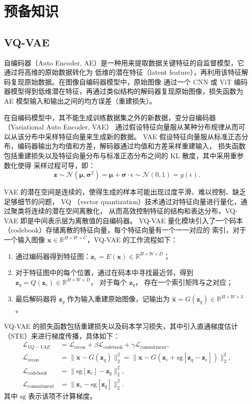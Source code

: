 \section{预备知识}
\subsection{VQ-VAE}
自编码器（Auto Encoder, AE）是一种用来提取数据关键特征的自监督模型，它通过将高维的原始数据转化为
低维的潜在特征（latent feature），再利用该特征解码复现原始数据。在图像自编码器模型中，原始图像
通过一个 CNN 或 ViT 编码器模型得到低维潜在特征，再通过类似结构的解码器复现原始图像，损失函数为
AE 模型输入和输出之间的均方误差（重建损失）。

在自编码模型中，其不能生成训练数据集之外的新数据，变分自编码器（Variational Auto Encoder, VAE）
通过假设特征向量服从某种分布规律从而可以从该分布中采样特征向量来生成新的数据。
VAE 假设特征向量服从标准正态分布，编码器输出为均值和方差，解码器通过均值和方差采样重建输入，
损失函数包括重建损失以及特征向量分布与标准正态分布之间的 KL 散度，其中采用重参数化使得
采样过程可导，即：
\begin{equation}
    \bm{z}\sim\mathcal{N}(\bm{\mu},\bm{\sigma}^2)=\bm{\mu}+\bm{\sigma}\cdot\epsilon
    \sim\mathcal{N}(0,1)=g(\epsilon).
\end{equation}

VAE 的潜在空间是连续的，使得生成的样本可能出现过度平滑、难以控制、缺乏足够细节的问题，
VQ （vector quantization）技术通过对特征向量进行量化，通过聚类将连续的潜在空间离散化，
从而高效控制特征的结构和表达分布，VQ-VAE 即是中间表示层为离散值的自编码器。
VQ-VAE 量化模块引入了一个码本（codebook）存储离散的特征向量，每个特征向量有一个一一对应的
索引，对于一个输入图像 $\bm{x}\in\mathbb{R}^{H\times W\times C}$，VQ-VAE 的工作流程如下：
\begin{enumerate}
    \item 通过编码器得到特征图：$\bm{z}_e=E(\bm{x})\in\mathbb{R}^{H\times W\times D}$；
    \item 对于特征图中的每个位置，通过在码本中寻找最近邻，得到 $\bm{z}_q=Q(\bm{z}_e)\in\mathbb{R}^{H\times W\times D}$，
    对于每个 $\bm{z}_q$， 存在一个索引矩阵与之对应；
    \item 最后解码器将 $\bm{z}_q$ 作为输入重建原始图像，记输出为 $\hat{\bm{x}}=G(\bm{z}_q)\in\mathbb{R}^{H\times W\times 3}$。
\end{enumerate}
VQ-VAE 的损失函数包括重建损失以及码本学习损失，其中引入直通梯度估计（STE）来进行梯度传播，具体如下：
\begin{align}
    \mathcal{L}_{VQ-VAE}&=\mathcal{L}_{\text{recon}} + \beta\mathcal{L}_{\text{codebook}} + \gamma\mathcal{L}_{\text{commitment}},\\
    \mathcal{L}_{\text{recon}}&=\|\bm{x}-G(\bm{z}_q)\|_2^2 = \|\bm{x}-G(\bm{z}_e + \text{sg}[\bm{z}_q-\bm{z}_e])\|_2^2,\\
    \mathcal{L}_{\text{codebook}}&=\|\text{sg}[\bm{z}_e]-\bm{z}_q\|_2^2,\\
    \mathcal{L}_{\text{commitment}}&=\|\bm{z}_e-\text{sg}[\bm{z}_q]\|_2^2.
\end{align}
其中 $\text{sg}$ 表示该项不计算梯度。

